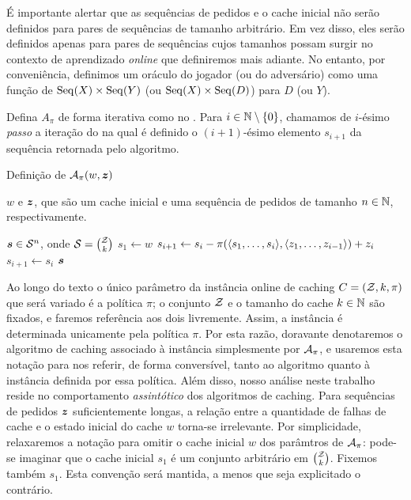 É importante alertar que as sequências de pedidos e o cache inicial não serão definidos para pares de sequências de tamanho arbitrário. Em vez disso, eles serão definidos apenas para pares de sequências cujos tamanhos possam surgir no contexto de aprendizado \emph{online} que definiremos mais adiante. No entanto, por conveniência, definimos um oráculo do jogador (ou do adversário) como uma função de \(\operatorname{Seq}(X) \times \operatorname{Seq}(Y)\) (ou \(\operatorname{Seq}(X) \times \operatorname{Seq}(D)\)) para \(D\) (ou \(Y\)).

Defina \(A_\pi\) de forma iterativa como no . Para \(i \in \mathbb{N} \setminus \{0\}\), chamamos de \(i\)-ésimo \emph{passo} a iteração do  na qual é definido o \((i+1)\)-ésimo elemento \(s_{i+1}\) da sequência retornada pelo algoritmo.

\begin{algorithm}
  \caption{Definição de \(\mathcal{A}_\pi(w, \bm{z})\)}
  \label{algo:cache}
  \begin{algorithmic}[1]
    \Require \(w\) e \(\bm{z}\), que são um cache inicial e uma sequência de pedidos de tamanho \(n \in \mathbb{N}\), respectivamente.

    \Ensure \(\bm{s} \in \mathcal{S}^n\), onde \(\mathcal{S} = \binom{\mathcal{Z}}{k}\)
    \State \(s_1 \gets w\)
    \State \(s_{i+1} \gets s_{i} - \pi(\langle s_1, \dotsc, s_{i}\rangle, \langle z_1, \dotsc, z_{i-1}\rangle) + z_i \) \label{linha}
    \Else
    \State \(s_{i+1} \gets s_i\)
    \EndIf
    \EndFor
    \State \Return \(\bm{s}\)
  \end{algorithmic}
\end{algorithm}

\newpage

Ao longo do texto o único parâmetro da instância online de caching \(C = (\mathcal{Z}, k, \pi)\) que será variado é a política \(\pi\); o conjunto \(\mathcal{Z}\) e o tamanho do cache \(k \in \mathbb{N}\) são fixados, e faremos referência aos dois livremente. Assim, a instância é determinada unicamente pela política \(\pi\). Por esta razão, doravante denotaremos o algoritmo de caching associado à instância simplesmente por \(\mathcal{A}_{\pi}\), e usaremos esta notação para nos referir, de forma conversível, tanto ao algoritmo quanto à instância definida por essa política. Além disso, nosso análise neste trabalho reside no comportamento \emph{assintótico} dos algoritmos de caching. Para sequências de pedidos \(\bm{z}\) suficientemente longas, a relação entre a quantidade de falhas de cache e o estado inicial do cache \(w\) torna-se irrelevante. Por simplicidade, relaxaremos a notação para omitir o cache inicial \(w\) dos parâmtros de \(\mathcal{A}_\pi\): pode-se imaginar que o cache inicial \(s_1\) é um conjunto arbitrário em \(\binom{\mathcal{Z}}{k}\). Fixemos também \(s_1\). Esta convenção será mantida, a menos que seja explicitado o contrário.
 
